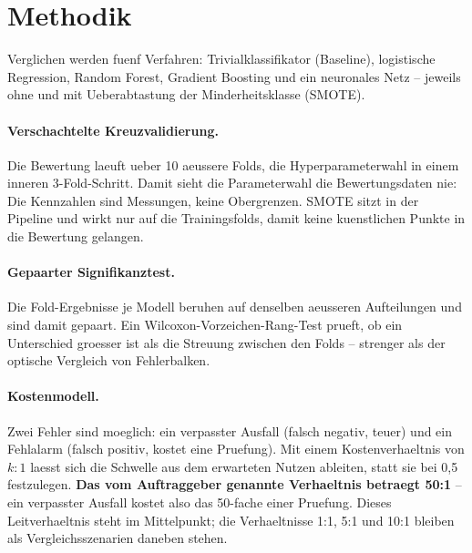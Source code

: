 \section{Methodik}

Verglichen werden fuenf Verfahren: Trivialklassifikator (Baseline),
logistische Regression, Random Forest, Gradient Boosting und ein neuronales
Netz -- jeweils ohne und mit Ueberabtastung der Minderheitsklasse (SMOTE).

\paragraph{Verschachtelte Kreuzvalidierung.}
Die Bewertung laeuft ueber 10 aeussere Folds, die Hyperparameterwahl in einem
inneren 3-Fold-Schritt. Damit sieht die Parameterwahl die Bewertungsdaten nie:
Die Kennzahlen sind Messungen, keine Obergrenzen. SMOTE sitzt in der Pipeline
und wirkt nur auf die Trainingsfolds, damit keine kuenstlichen Punkte in die
Bewertung gelangen.

\paragraph{Gepaarter Signifikanztest.}
Die Fold-Ergebnisse je Modell beruhen auf denselben aeusseren Aufteilungen und
sind damit gepaart. Ein Wilcoxon-Vorzeichen-Rang-Test prueft, ob ein
Unterschied groesser ist als die Streuung zwischen den Folds -- strenger als
der optische Vergleich von Fehlerbalken.

\paragraph{Kostenmodell.}
Zwei Fehler sind moeglich: ein verpasster Ausfall (falsch negativ, teuer) und
ein Fehlalarm (falsch positiv, kostet eine Pruefung). Mit einem
Kostenverhaeltnis von $k{:}1$ laesst sich die Schwelle aus dem erwarteten
Nutzen ableiten, statt sie bei 0,5 festzulegen. \textbf{Das vom Auftraggeber
genannte Verhaeltnis betraegt 50:1} -- ein verpasster Ausfall kostet also das
50-fache einer Pruefung. Dieses Leitverhaeltnis steht im Mittelpunkt; die
Verhaeltnisse 1:1, 5:1 und 10:1 bleiben als Vergleichsszenarien daneben
stehen.
